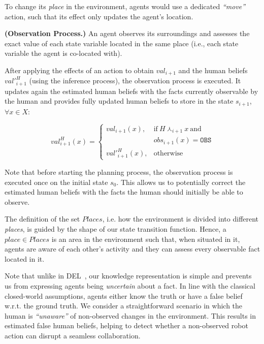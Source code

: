 To change its \textit{place} in the environment, agents would use a dedicated \textit{``move''} action, such that its effect only updates the agent's location. 

\begin{definition} 
\label{def:new_obs}
    \textbf{(Observation Process.)} An agent observes its surroundings and assesses the exact value of each state variable located in the same place (i.e., each state variable the agent is co-located with).
\end{definition}

After applying the effects of an action to obtain $val_{i+1}$ and the human beliefs $val'^H_{i+1}$ (using the inference process), the observation process is executed. It updates again the estimated human beliefs with the facts currently observable by the human and provides fully updated human beliefs to store in the state $s_{i+1}$, $\forall x \in X$:

\begin{equation}
val^H_{i+1}(x) = \left\{ 
\begin{array}{ll}
val_{i+1}(x), & \mbox{if}~ H \curlywedge_{i+1} x ~\mbox{and}~ \\
    & obs_{i+1}(x) = \texttt{OBS}\\
val'^H_{i+1}(x), & \mbox{otherwise}
\end{array}\right.
\end{equation}

Note that before starting the planning process, the observation process is executed once on the initial state $s_0$. This allows us to potentially correct the estimated human beliefs with the facts the human should initially be able to observe. 

The definition of the set $Places$, i.e. how the environment is divided into different \textit{places}, is guided by the shape of our state transition function. Hence, a $place \in Places$ is an area in the environment such that, when situated in it, agents are aware of each other's activity and they can assess every observable fact located in it. 

Note that unlike in DEL~\cite{KR2021-12}, our knowledge representation is simple and prevents us from expressing agents being \textit{uncertain} about a fact. 
In line with the classical closed-world assumptions, agents either know the truth or have a false belief w.r.t. the ground truth. 
We consider a straightforward scenario in which the human is \textit{``unaware''} of non-observed changes in the environment. 
This results in estimated false human beliefs, helping to detect whether a non-observed robot action can disrupt a seamless collaboration. 

